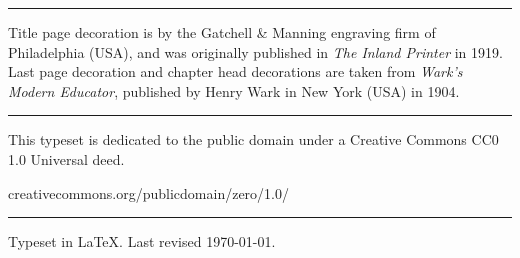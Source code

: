 \documentclass[
paper=5.5in:8.5in,
]{scrbook}
\begin{document}
\vfill
\rule{0.5\textwidth}{.4pt}
\vfill

\begin{minipage}{\textwidth}
Title page decoration is by the Gatchell \& Manning engraving firm of Philadelphia (USA), and was originally published in \textit{The Inland Printer} in 1919. Last page decoration and chapter head decorations are taken from \textit{Wark's Modern Educator}, published by Henry Wark in New York (USA) in 1904.
\end{minipage}

\vfill
\rule{0.5\textwidth}{.4pt}
\vfill

\begin{minipage}{\textwidth}
This typeset is dedicated to the public domain under a Creative Commons CC0 1.0 Universal deed.\end{minipage}
\vfill
creativecommons.org/publicdomain/zero/1.0/
\vfill
\rule{0.5\textwidth}{.4pt}
\vfill

Typeset in \LaTeX{}. Last revised \today.
\thispagestyle{empty}
\end{document}
